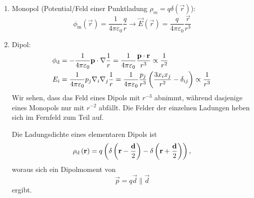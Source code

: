 \begin{enumerate}
	\item Monopol (Potential/Feld einer Punktladung $\rho _{m}=q\delta \left(\vec {r}\right)$):
	      \begin{equation*}
		      \phi _{\mathrm{m}}\left(\vec {r}\right)=\frac{1}{4\pi \varepsilon _{0}}\frac{q}{r}\rightarrow \vec {E}(\vec r)=\frac{q}{4\pi \varepsilon _{0}}\frac{\vec {r}}{r^{3}}
	      \end{equation*}
	\item Dipol:
	      \begin{align*}
		      \phi _{\mathop{}\!\mathrm{d} } & =-\frac{1}{4\pi \varepsilon _{0}}\mathbf{p}\cdot \nabla \frac{1}{r}=\frac{1}{4\pi \varepsilon _{0}}\frac{\mathbf{p}\cdot \mathbf{r}}{r^{3}}\propto \frac{1}{r^{2}}                                        \\
		      E_{i}          & =\frac{1}{4\pi \varepsilon _{0}}p_{j}\nabla _{i}\nabla _{j}\frac{1}{r}=\frac{1}{4\pi \varepsilon _{0}}\frac{p_{j}}{r^{3}}\left(\frac{3x_{i}x_{j}}{r^{2}}-\delta _{ij}\right)\propto \frac{1}{r^{3}}
	      \end{align*}
	      Wir sehen, dass das Feld eines Dipols mit $r^{-3}$ abnimmt, während dasjenige eines Monopols nur mit $r^{-2}$ abfällt. Die Felder der einzelnen Ladungen heben sich im Fernfeld zum Teil auf.

	      Die Ladungsdichte eines elementaren Dipols ist
	      \begin{equation*}
		      \rho _{\mathop{}\!\mathrm{d} }\left(\mathbf{r}\right)=q\left(\delta \left(\mathbf{r}-\frac{\mathbf{d}}{2}\right)-\delta \left(\mathbf{r}+\frac{\mathbf{d}}{2}\right)\right),
	      \end{equation*}
	      woraus sich ein Dipolmoment von
	      \begin{equation*}
		      \vec {p}=q\vec {d}\parallel \vec {d}
	      \end{equation*}
	      ergibt.


\end{enumerate}
